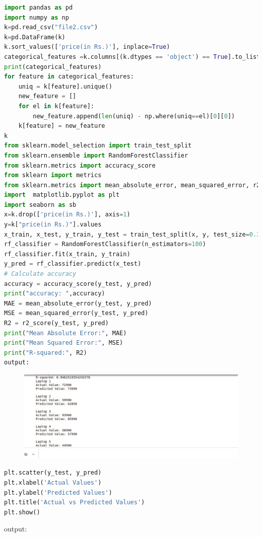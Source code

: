 \begin{lstlisting}[language=Python]
import pandas as pd
import numpy as np
k=pd.read_csv("file2.csv")
k=pd.DataFrame(k)
k.sort_values(['price(in Rs.)'], inplace=True)
categorical_features =k.columns[(k.dtypes == 'object') == True].to_list()
print(categorical_features)
for feature in categorical_features:
    uniq = k[feature].unique()
    new_feature = []
    for el in k[feature]:
        new_feature.append(len(uniq) - np.where(uniq==el)[0][0])
    k[feature] = new_feature   
k
from sklearn.model_selection import train_test_split
from sklearn.ensemble import RandomForestClassifier
from sklearn.metrics import accuracy_score
from sklearn import metrics
from sklearn.metrics import mean_absolute_error, mean_squared_error, r2_score
import  matplotlib.pyplot as plt
import seaborn as sb
x=k.drop(['price(in Rs.)'], axis=1)
y=k["price(in Rs.)"].values
x_train, x_test, y_train, y_test = train_test_split(x, y, test_size=0.3, random_state=42)
rf_classifier = RandomForestClassifier(n_estimators=100)
rf_classifier.fit(x_train, y_train)
y_pred = rf_classifier.predict(x_test)
# Calculate accuracy
accuracy = accuracy_score(y_test, y_pred)
print("accuracy: ",accuracy)
MAE = mean_absolute_error(y_test, y_pred)
MSE = mean_squared_error(y_test, y_pred)
R2 = r2_score(y_test, y_pred)
print("Mean Absolute Error:", MAE)
print("Mean Squared Error:", MSE)
print("R-squared:", R2)
output:
\end{lstlisting}
\begin{figure}[h]
\centering
\footnotesize
\includegraphics[width=6in]{56.jpeg}
\label{fig:unevenlight}
\end{figure}
\begin{lstlisting}[language=Python]
plt.scatter(y_test, y_pred)
plt.xlabel('Actual Values')
plt.ylabel('Predicted Values')
plt.title('Actual vs Predicted Values')
plt.show()
 \end{lstlisting} 
 output:    
